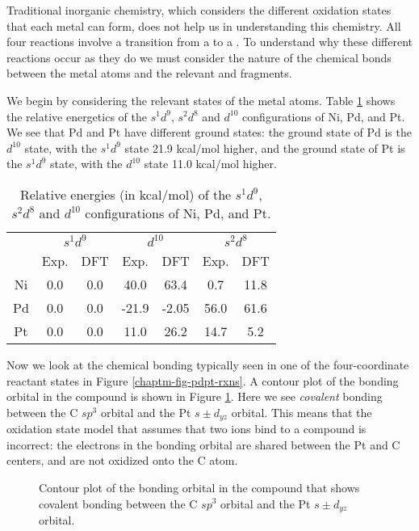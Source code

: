 Traditional inorganic chemistry, which considers the different
oxidation states that each metal can form, does not help us in
understanding this chemistry. All four reactions involve a transition
from a  to a . To understand why these
different reactions occur as they do we must consider the nature of
the chemical bonds between the metal atoms and the relevant 
and  fragments.

We begin by considering the relevant states of the metal atoms. Table
\ref{chaptm-tab-nipdpt} shows the relative energetics of the $s^1d^9$,
$s^2d^8$ and $d^{10}$ configurations of Ni, Pd, and Pt. We see that Pd
and Pt have different ground states: the ground state of Pd is the
$d^{10}$ state, with the $s^1d^9$ state 21.9 kcal/mol higher, and the
ground state of Pt is the $s^1d^9$ state, with the $d^{10}$ state 11.0
kcal/mol higher.

\begin{table}
\caption{Relative energies (in kcal/mol) of the $s^1d^9$,
$s^2d^8$ and $d^{10}$ configurations of Ni, Pd, and Pt.}
\label{chaptm-tab-nipdpt}
\begin{tabular}{ccccccc}\\ \hline
&\multicolumn{2}{c}{$s^1d^9$}&\multicolumn{2}{c}{$d^{10}$}&
 \multicolumn{2}{c}{$s^2d^8$}\\
& Exp. & DFT & Exp. & DFT & Exp. & DFT \\
Ni & 0.0 & 0.0 & 40.0 & 63.4 & 0.7 &  11.8\\
Pd & 0.0 & 0.0 & -21.9 & -2.05 & 56.0 & 61.6\\
Pt & 0.0 & 0.0 & 11.0 & 26.2 & 14.7 & 5.2 \\
\hline
\end{tabular}
\end{table}

Now we look at the chemical bonding typically seen in one of the
four-coordinate reactant states in Figure
\ref{chaptm-fig-pdpt-rxns}. A contour plot of the bonding orbital in
the  compound is shown in Figure
\ref{chaptm-fig-ptch3ch3-contour}.  Here we see \emph{covalent}
bonding between the C $sp^3$ orbital and the Pt $s\pm d_{yz}$
orbital. This means that the oxidation state model that assumes that
two  ions bind to a  compound is
incorrect: the electrons in the bonding orbital are shared between the
Pt and C centers, and are not oxidized onto the C atom. 

\begin{figure}
\begin{center}
\end{center}
\caption{Contour plot of the bonding orbital in the 
 compound that shows covalent bonding between
the C $sp^3$ orbital and the Pt $s\pm d_{yz}$ orbital.}
\label{chaptm-fig-ptch3ch3-contour}
\end{figure}

